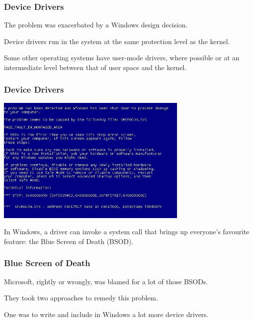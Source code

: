 \begin{frame}
\frametitle{Device Drivers}

The problem was exacerbated by a Windows design decision.

Device drivers run in the system at the same protection level as the kernel. 

Some other operating systems have user-mode drivers, where possible or at an intermediate level between that of user space and the kernel. 

\end{frame}

\begin{frame}
\frametitle{Device Drivers}

\begin{center}
	\includegraphics[width=0.7\textwidth]{images/bsod.jpg}
\end{center}

In Windows, a driver can invoke a system call that brings up everyone's favourite feature: the Blue Screen of Death (BSOD).

\end{frame}

\begin{frame}
\frametitle{Blue Screen of Death}

Microsoft, rightly or wrongly, was blamed for a lot of those BSODs. 

They took two approaches to remedy this problem. 

One was to write and include in Windows a lot more device drivers. 

\end{frame}

